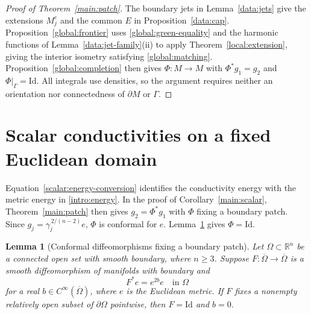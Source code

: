 \documentclass[11pt,a4paper]{article}
\newtheorem{lemma}[theorem]{Lemma}
\theoremstyle{definition}
\theoremstyle{remark}
\newcommand{\Id}{\mathrm{Id}}
\numberwithin{equation}{section}
\begin{document}
\begin{proof}[Proof of Theorem~\ref{main:patch}]
The boundary jets in Lemma~\ref{data:jets} give the extensions
$M_j^e$ and the common $E$ in Proposition~\ref{data:cap}.
Proposition~\ref{global:frontier} uses \eqref{global:green-equality}
and the harmonic functions of Lemma~\ref{data:jet-family}(ii) to
apply Theorem~\ref{local:extension}, giving the interior isometry
satisfying \eqref{global:matching}. Proposition~\ref{global:completion}
then gives $\Phi:M\to M$ with $\Phi^*g_1=g_2$ and $\Phi|_\Gamma=\Id$.
All integrals use densities, so the argument requires neither
an orientation nor connectedness of $\partial M$ or $\Gamma$.
\end{proof}
\section{Scalar conductivities on a fixed Euclidean domain}
\label{scalar:section}

Equation~\eqref{scalar:energy-conversion} identifies the conductivity
energy with the metric energy in \eqref{intro:energy}. In the proof
of Corollary~\ref{main:scalar}, Theorem~\ref{main:patch} then gives
$g_2=\Phi^*g_1$ with $\Phi$ fixing a boundary patch. Since
$g_j=\gamma_j^{\,2/(n-2)}e$, $\Phi$ is conformal for $e$.
Lemma~\ref{scalar:boundary-rigidity} gives $\Phi=\Id$.

\begin{lemma}[Conformal diffeomorphisms fixing a boundary patch]
\label{scalar:boundary-rigidity}
Let $\Omega\subset\mathbb R^n$ be a connected open set with smooth
boundary, where $n\ge3$. Suppose $F:\overline\Omega\to\overline\Omega$
is a smooth diffeomorphism of manifolds with boundary and
\[
 F^*e=e^{2b}e\quad\text{in }\Omega
\]
for a real $b\in C^\infty(\overline\Omega)$, where $e$ is the
Euclidean metric. If $F$ fixes a nonempty relatively open subset of
$\partial\Omega$ pointwise, then $F=\Id$ and $b=0$.
\end{lemma}
\end{document}

